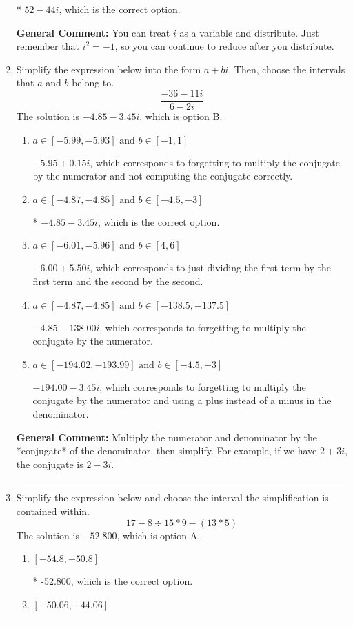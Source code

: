 \documentclass{extbook}[14pt]
\newcommand{\litem}[1]{\item #1

\rule{\textwidth}{0.4pt}}
\begin{document}
\begin{enumerate}
{\begin{enumerate}[label=\Alph*.]
* $52 - 44 i$, which is the correct option.
\end{enumerate}

\textbf{General Comment:} You can treat $i$ as a variable and distribute. Just remember that $i^2=-1$, so you can continue to reduce after you distribute.
}
\litem{
Simplify the expression below into the form $a+bi$. Then, choose the intervals that $a$ and $b$ belong to.
\[ \frac{-36 - 11 i}{6 - 2 i} \]The solution is \( -4.85  - 3.45 i \), which is option B.\begin{enumerate}[label=\Alph*.]
\item \( a \in [-5.99, -5.93] \text{ and } b \in [-1, 1] \)

 $-5.95  + 0.15 i$, which corresponds to forgetting to multiply the conjugate by the numerator and not computing the conjugate correctly.
\item \( a \in [-4.87, -4.85] \text{ and } b \in [-4.5, -3] \)

* $-4.85  - 3.45 i$, which is the correct option.
\item \( a \in [-6.01, -5.96] \text{ and } b \in [4, 6] \)

 $-6.00  + 5.50 i$, which corresponds to just dividing the first term by the first term and the second by the second.
\item \( a \in [-4.87, -4.85] \text{ and } b \in [-138.5, -137.5] \)

 $-4.85  - 138.00 i$, which corresponds to forgetting to multiply the conjugate by the numerator.
\item \( a \in [-194.02, -193.99] \text{ and } b \in [-4.5, -3] \)

 $-194.00  - 3.45 i$, which corresponds to forgetting to multiply the conjugate by the numerator and using a plus instead of a minus in the denominator.
\end{enumerate}

\textbf{General Comment:} Multiply the numerator and denominator by the *conjugate* of the denominator, then simplify. For example, if we have $2+3i$, the conjugate is $2-3i$.
}
\litem{
Simplify the expression below and choose the interval the simplification is contained within.
\[ 17 - 8 \div 15 * 9 - (13 * 5) \]The solution is \( -52.800 \), which is option A.\begin{enumerate}[label=\Alph*.]
\item \( [-54.8, -50.8] \)

* -52.800, which is the correct option.
\item \( [-50.06, -44.06] \)


\end{enumerate}}
\end{enumerate}
\end{document}
